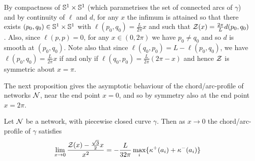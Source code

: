 \documentclass[11pt]{amsart}
\begin{document}
\begin{remark}
By compactness of \(\mathbb{S}^1\times \mathbb{S}^1\) (which parametrises the set of connected arcs of \(\gamma\)) and by continuity of \(\ell\) and \(d\), for any \(x\) the infimum is attained so that there exists \((p_0,q_0) \in \mathbb{S}^1 \times \mathbb{S}^1\) with \(\ell(p_0, q_0) = \frac{L}{2\pi}x\) and such that \(\operatorname{\mathcal{Z}}(x) = \frac{2\pi}{L} d(p_0, q_0)\). Also, since \(\ell(p,p) = 0\), for any \(x\in(0,2\pi)\) we have \(p_0 \ne q_0\) and so \(d\) is smooth at \((p_0, q_0)\). Note also that since \(\ell(q_0, p_0) = L - \ell(p_0, q_0)\), we have \(\ell(p_0, q_0) = \tfrac{L}{2\pi}x\) if and only if \(\ell(q_0, p_0) = \frac{L}{2\pi}(2\pi - x)\) and hence \(\operatorname{\mathcal{Z}}\) is symmetric about \(x = \pi\).
\end{remark}

The next proposition gives the asymptotic behaviour of the chord/arc-profile of networks \(\operatorname{\mathcal{N}}\), near the end point \(x=0\), and so by symmetry also at the end point \(x=2\pi\).

\begin{prop}
\label{prop:asymptotics}
Let \(\operatorname{\mathcal{N}}\) be a network, with piecewise closed curve \(\gamma\). Then as \(x\to 0\) the chord/arc-profile of \(\gamma\) satisfies
\[
\lim_{x\to 0} \frac{\operatorname{\mathcal{Z}}(x) - \tfrac{\sqrt{3}}{2}x}{x^2} = - \frac{L}{32\pi} \max_i \{\operatorname{\kappa}^+(a_i) + \operatorname{\kappa}^-(a_i)\}
\]
\end{prop}
\end{document}

